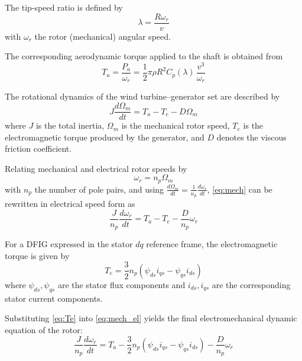 \documentclass[conference]{IEEEtran}
\begin{document}
The tip-speed ratio is defined by
\begin{equation}
\lambda = \frac{R\omega_r}{v}
\end{equation}
with $\omega_r$ the rotor (mechanical) angular speed.

The corresponding aerodynamic torque applied to the shaft is obtained from
\begin{equation}
T_a = \frac{P_a}{\omega_r} = \frac{1}{2}\pi\rho R^2 C_p(\lambda)\,\frac{v^3}{\omega_r}
\label{eq:Ta}
\end{equation}

The rotational dynamics of the wind turbine--generator set are described by
\begin{equation}
J\frac{d\Omega_m}{dt} = T_a - T_e - D\Omega_m
\label{eq:mech}
\end{equation}
where $J$ is the total inertia, $\Omega_m$ is the mechanical rotor speed, $T_e$ is the electromagnetic torque produced by the generator, and $D$ denotes the viscous friction coefficient.

Relating mechanical and electrical rotor speeds by
\begin{equation}
\omega_r = n_p\Omega_m
\end{equation}
with $n_p$ the number of pole pairs, and using $\frac{d\Omega_m}{dt} = \frac{1}{n_p}\frac{d\omega_r}{dt}$, \eqref{eq:mech} can be rewritten in electrical speed form as
\begin{equation}
\frac{J}{n_p}\frac{d\omega_r}{dt} = T_a - T_e - \frac{D}{n_p}\omega_r
\label{eq:mech_el}
\end{equation}

For a DFIG expressed in the stator $dq$ reference frame, the electromagnetic torque is given by
\begin{equation}
T_e = \frac{3}{2}n_p\left(\psi_{ds}i_{qs} - \psi_{qs}i_{ds}\right)
\label{eq:Te}
\end{equation}
where $\psi_{ds},\psi_{qs}$ are the stator flux components and $i_{ds},i_{qs}$ are the corresponding stator current components.

Substituting \eqref{eq:Te} into \eqref{eq:mech_el} yields the final electromechanical dynamic equation of the rotor:
\begin{equation}
\frac{J}{n_p}\frac{d\omega_r}{dt} = T_a - \frac{3}{2}n_p\left(\psi_{ds}i_{qs} - \psi_{qs}i_{ds}\right) - \frac{D}{n_p}\omega_r
\label{eq:rotor}
\end{equation}
\end{document}
